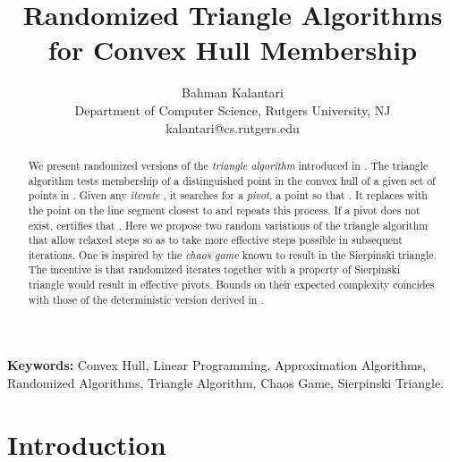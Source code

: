 \documentclass{article}
\theoremstyle{definition}
\begin{document}
\title{Randomized Triangle Algorithms for Convex Hull Membership}
\author{ Bahman Kalantari\\
Department of Computer Science, Rutgers University, NJ\\
kalantari@cs.rutgers.edu
}
\date{}
\maketitle


\begin{abstract}
We present randomized versions of the {\it triangle algorithm} introduced in \cite{kal14}. The triangle algorithm tests membership of a distinguished point   in the convex hull of a given set  of  points in .  Given any {\it iterate} , it searches for a {\it pivot}, a point  so that .  It replaces  with the point on the line segment  closest to  and repeats this process. If a pivot does not exist,  certifies that
.  Here we propose two  random variations of the triangle algorithm that allow relaxed steps so as to take more effective steps possible in subsequent iterations. One is inspired by the {\it chaos game} known to result in the Sierpinski triangle.  The incentive is that randomized iterates together with a property of Sierpinski triangle would result in effective pivots. Bounds on their expected complexity coincides with those of the deterministic version derived in \cite{kal14}.
\end{abstract}

{\bf Keywords:}  Convex Hull, Linear Programming,  Approximation Algorithms, Randomized Algorithms, Triangle Algorithm, Chaos Game, Sierpinski Triangle.

\section{Introduction}
\end{document}
